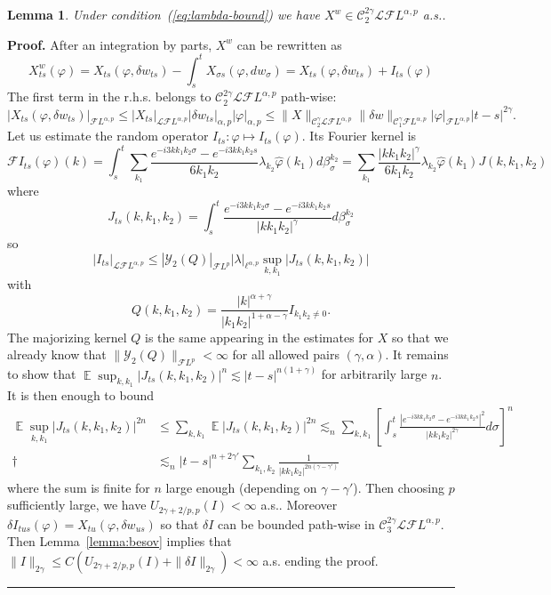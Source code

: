 \documentclass[a4paper,11pt,reqno]{article}
\DeclareMathOperator{\expect}{{\mathbb E}}
\newcommand{\der}{\delta}
\newcommand{\CC}{\mathcal{C}}
\newcommand{\FF}{\mathcal{F}}
\newcommand{\LL}{\mathcal{L}}
\newcommand{\YY}{\mathcal{Y}}
\newcommand{\wh}{\widehat}
\newtheorem{lemma}[theorem]{Lemma}
\newenvironment{proof}[1][Proof]{\textbf{#1.} }{\ \rule{0.5em}{0.5em}}
\begin{document}
\begin{lemma}
\label{lemma:Xw}
Under condition~(\ref{eq:lambda-bound})
we have $X^w \in \CC^{2\gamma}_2 \LL \FF L^{\alpha,p}$ a.s..
\end{lemma}
\begin{proof}
After an integration by parts, $X^w$ can be rewritten as
\begin{equation}
  \label{eq:Xw-2}
  X^w_{ts}(\varphi) = X_{ts}(\varphi,\der w_{ts}) - \int_s^t X_{\sigma
  s}(\varphi,dw_\sigma) = X_{ts}(\varphi,\der w_{ts}) + I_{ts}(\varphi) 
\end{equation}
The first term in the r.h.s. belongs to $\CC_2^{2\gamma}
\LL \FF L^{\alpha,p}$ path-wise:
$$
|X_{ts}(\varphi,\der w_{ts})|_{\FF L^{\alpha,p}} \le
|X_{ts}|_{\LL \FF L^{\alpha,p}} |\der w_{ts}|_{\alpha,p}
|\varphi|_{\alpha,p} \le 
\|X\|_{\CC^\gamma_2 \LL \FF L^{\alpha,p}} \|\der
w\|_{\CC_1^\gamma \FF L^{\alpha,p}} |\varphi|_{\FF L^{\alpha,p}} |t-s|^{2\gamma}.
$$
Let us estimate the random operator $I_{ts} : \varphi \mapsto I_{ts}(\varphi)$. Its Fourier kernel is
$$
\FF I_{ts}(\varphi)(k) = \int_{s}^t \sum_{k_1} \frac{e^{-i 3kk_1 k_2 \sigma}-e^{-i 3k k_1 k_2 s}}{6 k_1 k_2}  \lambda_{k_2} \wh\varphi(k_1) d\beta^{k_2}_\sigma
=  \sum_{k_1} \frac{|k k_1 k_2|^\gamma}{6 k_1 k_2} \lambda_{k_2} \wh\varphi(k_1) J(k,k_1,k_2)
$$
where 
$$
J_{ts}(k,k_1,k_2) =  \int_{s}^t \frac{e^{-i 3kk_1 k_2 \sigma}-e^{-i 3k k_1 k_2 s}}{ |k k_1 k_2|^{\gamma}}   d\beta^{k_2}_\sigma
$$
so
$$
|I_{ts}|_{\LL \FF L^{\alpha,p}} \le |\YY_2(Q)|_{\FF L^p} |\lambda|_{\ell^{\alpha,p}} \sup_{k,k_1} |J_{ts}(k,k_1,k_2)|
$$
with 
$$
Q(k,k_1,k_2) = \frac{|k|^{\alpha+\gamma}}{|k_1 k_2|^{1+\alpha-\gamma}} I_{k_1 k_2 \neq 0} .
$$
The majorizing kernel $Q$ is the same appearing in the estimates for $X$ so that we already know that $\|\YY_2(Q)\|_{\FF L^p} < \infty$ for all allowed pairs $(\gamma,\alpha)$. It remains to show that
$
\expect \sup_{k,k_1} |J_{ts}(k,k_1,k_2)|^n \lesssim |t-s|^{n(1+\gamma)} 
$
for arbitrarily large $n$. It is then enough to bound
\begin{equation*}
\begin{split}
\expect \sup_{k,k_1} |J_{ts}(k,k_1,k_2)|^{2n} & \le \sum_{k,k_1} \expect  |J_{ts}(k,k_1,k_2)|^{2n}
\lesssim_n \sum_{k,k_1} \left[\int_s^t \frac{|e^{-i 3kk_1 k_2 \sigma}-e^{-i 3k k_1 k_2 s}|^2}{ |k k_1 k_2|^{2\gamma}} d\sigma  \right]^n
\\†& \lesssim_n |t-s|^{n+2 \gamma'} \sum_{k_1,k_2}  \frac{1}{ |k k_1 k_2|^{2n(\gamma-\gamma')}} 
\end{split}
\end{equation*}
where the sum is finite for $n$ large enough (depending on $\gamma-\gamma'$).
Then choosing $p$ sufficiently large, we
have $U_{2\gamma+2/p,p}(I) < \infty$ a.s.. Moreover $\der I_{tus}(\varphi)
= X_{tu}(\varphi,\der w_{us})$ so that $\der I$ can be bounded
path-wise in $\CC_3^{2\gamma} \LL \FF L^{\alpha,p}$.  
Then Lemma~\ref{lemma:besov} implies that 
$
\|I\|_{2\gamma} \le C(U_{2\gamma+2/p,p}(I)+\|\der I\|_{2\gamma}) < \infty
$ a.s.
ending the proof.
\end{proof}
%
\end{document}
